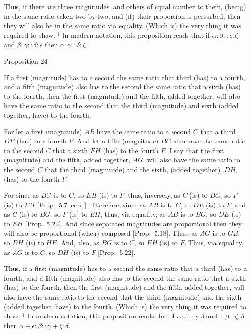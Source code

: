 Thus, if there are three magnitudes, and others of  equal number to them, (being) in the same ratio taken two by two, and (if) their
proportion is perturbed, then they will also be in the same ratio via equality.
(Which is) the very thing it was required to show.
{\footnotesize \noindent$^\dag$ In modern notation, this proposition
reads that if $\alpha:\beta::\epsilon:\zeta$ and $\beta:\gamma::\delta:\epsilon$ then $\alpha:\gamma::\delta:\zeta$.}


\begin{center}
{\large Proposition 24}$^\dag$
\end{center}

If a first (magnitude) has to a second the same
ratio  that third (has) to a fourth, and a fifth (magnitude)
also has to the second the same ratio that a sixth  (has) to the fourth, then
  the first (magnitude) and the fifth, added together, will also have the same ratio to the
 second
 that the third (magnitude) and sixth  (added together, have) to the fourth.
 
\epsfysize=1.4in
\centerline{}
 
 For let a first (magnitude) $AB$ have the same ratio to a second $C$
 that a third $DE$ (has) to a fourth $F$. And let a fifth (magnitude) $BG$
 also have the same ratio to the second $C$ that a sixth $EH$ (has) to
 the fourth $F$. I say that the first (magnitude) and the fifth, added together, $AG$, will also  have the same ratio to the second $C$ that the third (magnitude) and the sixth, (added together), $DH$,  (has) to the fourth $F$.
 
 For since as $BG$ is to $C$, so $EH$ (is) to $F$,  thus, inversely, as $C$ (is) to $BG$,
 so $F$ (is) to $EH$  [Prop.~5.7~corr.]. Therefore,
 since as $AB$ is to $C$, so $DE$ (is) to $F$, and as $C$ (is) to $BG$, so
 $F$ (is) to $EH$, thus, via equality, as $AB$ is to $BG$, so $DE$ (is) to $EH$ 
[Prop.~5.22]. And since separated magnitudes
are proportional then they will also be proportional (when) composed [Prop.~5.18]. Thus, as $AG$ is to $GB$, so $DH$
(is) to $HE$. And, also, as $BG$ is to $C$, so $EH$ (is) to $F$. Thus, via equality, 
as $AG$ is to $C$, so $DH$ (is) to $F$ [Prop.~5.22].

Thus, if a first (magnitude) has to a second the same
ratio that a third (has) to a fourth, and a fifth (magnitude)
also has to the second the same ratio that a sixth  (has) to the fourth, then
the first (magnitude) and the fifth, added together, will also have the same ratio to the
 second
 that the third (magnitude) and the sixth  (added together, have) to the fourth. (Which is) the very thing it was required to show.
{\footnotesize \noindent$^\dag$ In modern notation, this proposition
reads that if $\alpha:\beta::\gamma:\delta$ and $\epsilon:\beta::\zeta:\delta$ then $\alpha+\epsilon:\beta::\gamma+\zeta:\delta$.}

